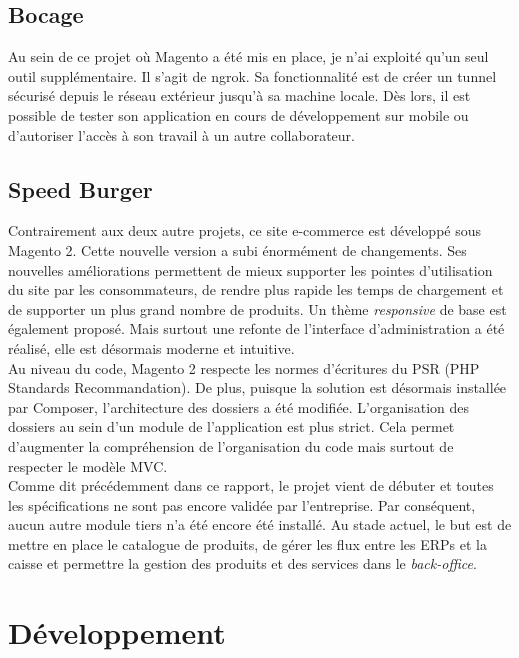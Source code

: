 \documentclass[12pt, a4paper, twoside]{report}
\begin{document}
\section{Bocage}

Au sein de ce projet où Magento a été mis en place, je n'ai exploité qu'un seul outil supplémentaire. Il s'agit de ngrok. Sa fonctionnalité est de créer un tunnel sécurisé depuis le réseau extérieur jusqu'à sa machine locale. Dès lors, il est possible de tester son application en cours de développement sur mobile ou d'autoriser l'accès à son travail à un autre collaborateur.

\section{Speed Burger}

Contrairement aux deux autre projets, ce site e-commerce est développé sous Magento 2. Cette nouvelle version a subi énormément de changements. Ses nouvelles améliorations permettent de mieux supporter les pointes d'utilisation du site par les consommateurs, de rendre plus rapide les temps de chargement et de supporter un plus grand nombre de produits. Un thème \textit{responsive} de base est également proposé. Mais surtout une refonte de l'interface d'administration a été réalisé, elle est désormais moderne et intuitive. \\ 

Au niveau du code, Magento 2 respecte les normes d'écritures du PSR (PHP Standards Recommandation). De plus, puisque la solution est désormais installée par Composer, l'architecture des dossiers a été modifiée. L'organisation des dossiers au sein d'un module de l'application est plus strict. Cela permet d'augmenter la compréhension de l'organisation du code mais surtout de respecter le modèle MVC. \\

Comme dit précédemment dans ce rapport, le projet vient de débuter et toutes les spécifications ne sont pas encore validée par l'entreprise. Par conséquent, aucun autre module tiers n'a été encore été installé. Au stade actuel, le but est de mettre en place le catalogue de produits, de gérer les flux entre les ERPs et la caisse et permettre la gestion des produits et des services dans le \textit{back-office}.

\chapter{Développement}
\end{document}

